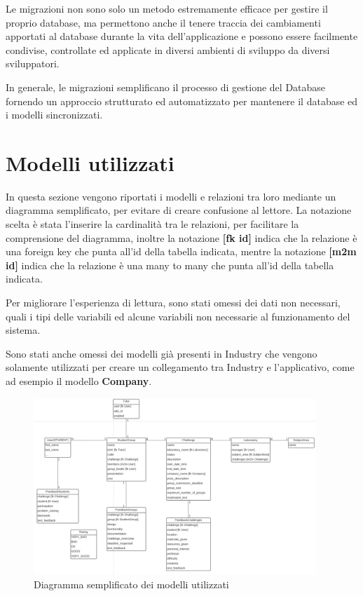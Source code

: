 Le migrazioni non sono solo un metodo estremamente efficace per gestire il proprio database, ma permettono anche il tenere traccia dei cambiamenti apportati al database durante la vita dell'applicazione e possono essere facilmente condivise, controllate ed applicate in diversi ambienti di sviluppo da diversi sviluppatori.


In generale, le migrazioni semplificano il processo di gestione del Database fornendo un approccio strutturato ed automatizzato per mantenere il database ed i modelli sincronizzati.

\section{Modelli utilizzati}
In questa sezione vengono riportati i modelli e relazioni tra loro mediante un diagramma semplificato, per evitare di creare confusione al lettore. La notazione scelta è stata l'inserire la cardinalità tra le relazioni, per facilitare la comprensione del diagramma, inoltre la notazione \textbf{[fk id]} indica che la relazione è una foreign key che punta all'id della tabella indicata, mentre la notazione \textbf{[m2m id]} indica che la relazione è una many to many che punta all'id della tabella indicata.

Per migliorare l'esperienza di lettura, sono stati omessi dei dati non necessari, quali i tipi delle variabili ed alcune variabili non necessarie al funzionamento del sistema.

Sono stati anche omessi dei modelli già presenti in Industry che vengono solamente utilizzati per creare un collegamento tra Industry e l'applicativo, come ad esempio il modello \textbf{Company}. 
\begin{figure}[H]
    \begin{center}
        \includegraphics[width=0.95\textwidth]{images/modelli_db.png}
    \end{center}
    \caption{Diagramma semplificato dei modelli utilizzati}
    \label{fig:modelli_db}
\end{figure}

